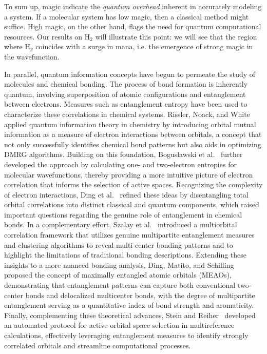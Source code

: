 \documentclass[aps,prl,twocolumn,groupedaddress, reprint,floatfix,nofootinbib,longbibliography]{revtex4-2}
\begin{document}
    To sum up, magic indicate the \textit{quantum overhead} inherent in accurately modeling a system. If a molecular system has low magic, then a classical method might suffice. High magic, on the other hand, flags the need for quantum computational resources. Our results on H$_2$ will illustrate this point: we will see that the region where H$_2$ coincides with a surge in mana, i.e. the emergence of strong magic in the wavefunction.

    In parallel, quantum information concepts have begun to permeate the study of molecules and chemical bonding. The process of bond formation is inherently quantum, involving superposition of atomic configurations and entanglement between electrons. Measures such as entanglement entropy have been used to characterize these correlations in chemical systems. Rissler, Noack, and White \cite{rissler2006measuring} applied quantum information theory in chemistry by introducing orbital mutual information as a measure of electron interactions between orbitals, a concept that not only successfully identifies chemical bond patterns but also aids in optimizing DMRG algorithms. Building on this foundation, Boguslawski et al. \cite{boguslawski2015orbital} further developed the approach by calculating one- and two-electron entropies for molecular wavefunctions, thereby providing a more intuitive picture of electron correlation that informs the selection of active spaces. Recognizing the complexity of electron interactions, Ding et al. \cite{ding2020concept} refined these ideas by disentangling total orbital correlations into distinct classical and quantum components, which raised important questions regarding the genuine role of entanglement in chemical bonds. In a complementary effort, Szalay et al. \cite{szalay2017correlation} introduced a multiorbital correlation framework that utilizes genuine multipartite entanglement measures and clustering algorithms to reveal multi-center bonding patterns and to highlight the limitations of traditional bonding descriptions. Extending these insights to a more nuanced bonding analysis, Ding, Matito, and Schilling \cite{ding2025entanglement} proposed the concept of maximally entangled atomic orbitals (MEAOs), demonstrating that entanglement patterns can capture both conventional two-center bonds and delocalized multicenter bonds, with the degree of multipartite entanglement serving as a quantitative index of bond strength and aromaticity. Finally, complementing these theoretical advances, Stein and Reiher \cite{stein2016automated} developed an automated protocol for active orbital space selection in multireference calculations, effectively leveraging entanglement measures to identify strongly correlated orbitals and streamline computational processes.
\end{document}
